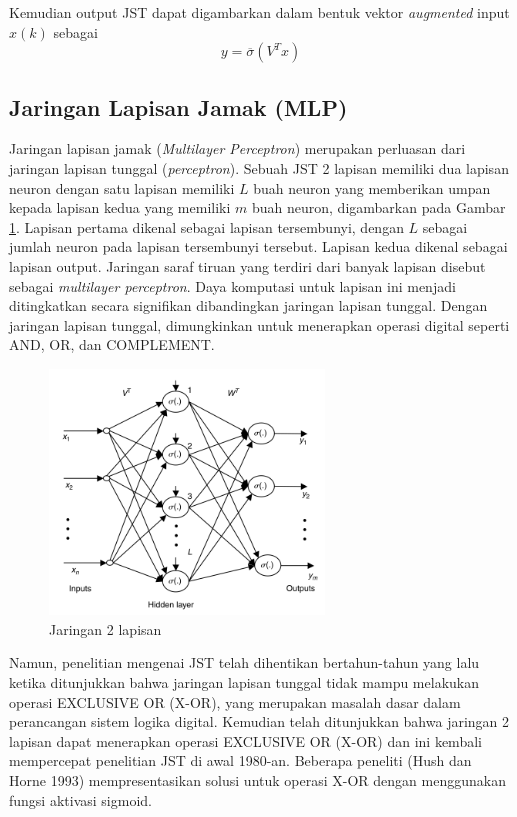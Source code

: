 Kemudian output JST dapat digambarkan dalam bentuk vektor \textit{augmented} input $x(k)$ sebagai
\vspace{0em}
\begin{equation} \label{eq:3:finalVector}
y = \overline{\sigma}(V^Tx)
\end{equation}

\subsection{Jaringan Lapisan Jamak (MLP)}
Jaringan lapisan jamak (\textit{Multilayer Perceptron}) merupakan perluasan dari jaringan lapisan tunggal (\textit{perceptron}). Sebuah JST 2 lapisan memiliki dua lapisan neuron dengan satu lapisan memiliki $L$ buah neuron yang memberikan umpan kepada lapisan kedua yang memiliki $m$ buah neuron, digambarkan pada Gambar \ref{fig:3:mlp}. Lapisan pertama dikenal sebagai lapisan tersembunyi, dengan $L$ sebagai jumlah neuron pada lapisan tersembunyi tersebut. Lapisan kedua dikenal sebagai lapisan output. Jaringan saraf tiruan yang terdiri dari banyak lapisan disebut sebagai \textit{multilayer perceptron}. Daya komputasi untuk lapisan ini menjadi ditingkatkan secara signifikan dibandingkan jaringan lapisan tunggal. Dengan jaringan lapisan tunggal, dimungkinkan untuk menerapkan operasi digital seperti AND, OR, dan COMPLEMENT. 
\begin{figure}[!h]
	\centering
	\includegraphics[width=0.65\textwidth]{figures/mlp}
	\caption{Jaringan 2 lapisan \cite{NNControlBook}}
	\label{fig:3:mlp}
\end{figure}
Namun, penelitian mengenai JST telah dihentikan bertahun-tahun yang lalu ketika ditunjukkan bahwa jaringan lapisan tunggal tidak mampu melakukan operasi EXCLUSIVE OR (X-OR), yang merupakan masalah dasar dalam perancangan sistem logika digital. Kemudian telah ditunjukkan bahwa jaringan 2 lapisan dapat menerapkan operasi EXCLUSIVE OR (X-OR) dan ini kembali mempercepat penelitian JST di awal 1980-an. Beberapa peneliti (Hush dan Horne 1993) mempresentasikan solusi untuk operasi X-OR dengan menggunakan fungsi aktivasi sigmoid. \cite{NNControlBook}

